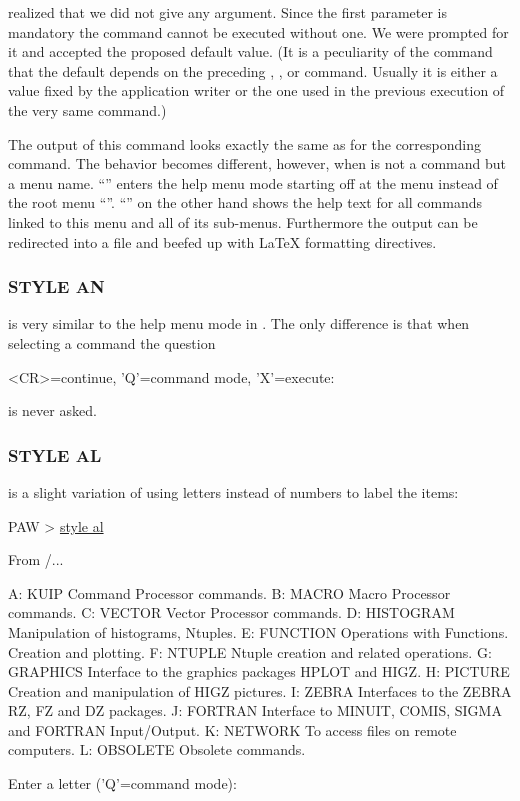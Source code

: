\KUIP{} realized that we did not give any argument.
Since the first parameter  is mandatory the command cannot be
executed without one.
We were prompted for it and accepted the proposed default value.
(It is a peculiarity of the  command that the default
depends on the preceding , , or 
command. 
Usually it is either a value fixed by the application writer or the one
used in the previous execution of the very same command.)

The output of this  command looks exactly the same as for
the corresponding  command.
The behavior becomes different, however, when  is not a
command but a menu name.
``'' enters the help menu mode starting off at the
 menu instead of the root menu ``\Lit{/}''.
``'' on the other hand shows the help text for all
commands linked to this menu and all of its sub-menus.
Furthermore the output can be redirected into a file and beefed up with
\LaTeX{} formatting directives.


\subsubsection{STYLE AN}

 is very similar to the help menu mode in 
.
The only difference is that when selecting a command the question
\begin{XMP}
<CR>=continue, 'Q'=command mode, 'X'=execute:
\end{XMP}
is never asked.

\subsubsection{STYLE AL}

 is a slight variation of  using
letters instead of numbers to label the items:
\begin{XMP}
PAW > \underline{style al}

From  /...

 A:   KUIP          Command Processor commands.
 B:   MACRO         Macro Processor commands.
 C:   VECTOR        Vector Processor commands.
 D:   HISTOGRAM     Manipulation of histograms, Ntuples.
 E:   FUNCTION      Operations with Functions. Creation and plotting.
 F:   NTUPLE        Ntuple creation and related operations.
 G:   GRAPHICS      Interface to the graphics packages HPLOT and HIGZ.
 H:   PICTURE       Creation and manipulation of HIGZ pictures.
 I:   ZEBRA         Interfaces to the ZEBRA RZ, FZ and DZ packages.
 J:   FORTRAN       Interface to MINUIT, COMIS, SIGMA and FORTRAN Input/Output.
 K:   NETWORK       To access files on remote computers.
 L:   OBSOLETE      Obsolete commands.

Enter a letter ('Q'=command mode): 
\end{XMP}


